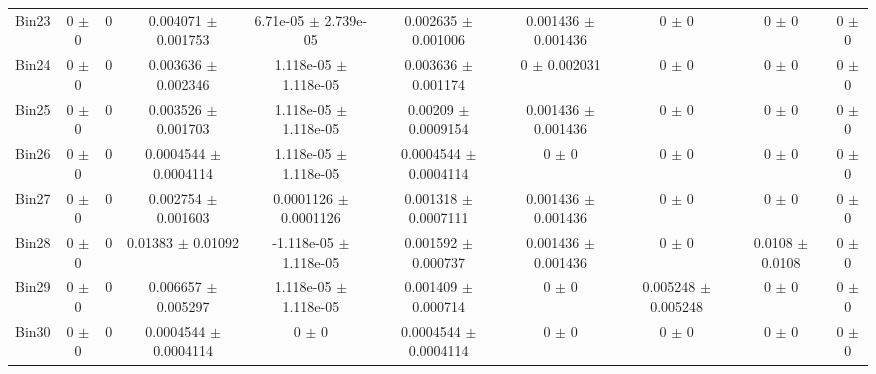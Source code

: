 \begin{tabular}{@{\extracolsep{4pt}}lccccccccc@{}}
     Bin23 & 0 $\pm$ 0 & 0 & 0.004071 $\pm$ 0.001753 & 6.71e-05 $\pm$ 2.739e-05 & 0.002635 $\pm$ 0.001006 & 0.001436 $\pm$ 0.001436 & 0 $\pm$ 0 & 0 $\pm$ 0 & 0 $\pm$ 0 \\ 
     Bin24 & 0 $\pm$ 0 & 0 & 0.003636 $\pm$ 0.002346 & 1.118e-05 $\pm$ 1.118e-05 & 0.003636 $\pm$ 0.001174 & 0 $\pm$ 0.002031 & 0 $\pm$ 0 & 0 $\pm$ 0 & 0 $\pm$ 0 \\ 
     Bin25 & 0 $\pm$ 0 & 0 & 0.003526 $\pm$ 0.001703 & 1.118e-05 $\pm$ 1.118e-05 & 0.00209 $\pm$ 0.0009154 & 0.001436 $\pm$ 0.001436 & 0 $\pm$ 0 & 0 $\pm$ 0 & 0 $\pm$ 0 \\ 
     Bin26 & 0 $\pm$ 0 & 0 & 0.0004544 $\pm$ 0.0004114 & 1.118e-05 $\pm$ 1.118e-05 & 0.0004544 $\pm$ 0.0004114 & 0 $\pm$ 0 & 0 $\pm$ 0 & 0 $\pm$ 0 & 0 $\pm$ 0 \\ 
     Bin27 & 0 $\pm$ 0 & 0 & 0.002754 $\pm$ 0.001603 & 0.0001126 $\pm$ 0.0001126 & 0.001318 $\pm$ 0.0007111 & 0.001436 $\pm$ 0.001436 & 0 $\pm$ 0 & 0 $\pm$ 0 & 0 $\pm$ 0 \\ 
     Bin28 & 0 $\pm$ 0 & 0 & 0.01383 $\pm$ 0.01092 & -1.118e-05 $\pm$ 1.118e-05 & 0.001592 $\pm$ 0.000737 & 0.001436 $\pm$ 0.001436 & 0 $\pm$ 0 & 0.0108 $\pm$ 0.0108 & 0 $\pm$ 0 \\ 
     Bin29 & 0 $\pm$ 0 & 0 & 0.006657 $\pm$ 0.005297 & 1.118e-05 $\pm$ 1.118e-05 & 0.001409 $\pm$ 0.000714 & 0 $\pm$ 0 & 0.005248 $\pm$ 0.005248 & 0 $\pm$ 0 & 0 $\pm$ 0 \\ 
     Bin30 & 0 $\pm$ 0 & 0 & 0.0004544 $\pm$ 0.0004114 & 0 $\pm$ 0 & 0.0004544 $\pm$ 0.0004114 & 0 $\pm$ 0 & 0 $\pm$ 0 & 0 $\pm$ 0 & 0 $\pm$ 0 \\ 
\hline\hline
  \end{tabular}
